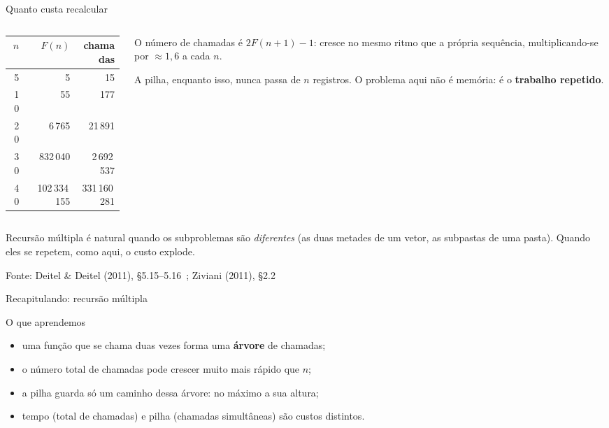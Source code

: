 \documentclass[aspectratio=169]{beamer}
\newcommand{\fonte}[1]{\vfill\hfill{\scriptsize\textcolor{UFSGray}{Fonte: #1}}}
\begin{document}
\begin{frame}{Quanto custa recalcular}
  \begin{columns}[c]
    \begin{column}{0.46\textwidth}
      \begin{center}
        \small
        \begin{tabular}{rrr}
          \toprule
          $n$ & $F(n)$ & chamadas\\
          \midrule
          5  & 5           & 15\\
          10 & 55          & 177\\
          20 & 6\,765      & 21\,891\\
          30 & 832\,040    & 2\,692\,537\\
          40 & 102\,334\,155 & 331\,160\,281\\
          \bottomrule
        \end{tabular}
      \end{center}
    \end{column}
    \begin{column}{0.5\textwidth}
      \small
      O número de chamadas é $2F(n+1) - 1$: cresce no mesmo ritmo que a
      própria sequência, multiplicando-se por $\approx 1{,}6$ a cada
      $n$.

      \medskip
      A pilha, enquanto isso, nunca passa de $n$ registros. O problema
      aqui não é memória: é o \textbf{trabalho repetido}.
    \end{column}
  \end{columns}
  \begin{block}{}
    \small Recursão múltipla é natural quando os subproblemas são
    \emph{diferentes} (as duas metades de um vetor, as subpastas de uma
    pasta). Quando eles se repetem, como aqui, o custo explode.
  \end{block}
  \fonte{Deitel \& Deitel (2011), §5.15--5.16~\cite{deitel2011como};
    Ziviani (2011), §2.2~\cite{ziviani2011projeto}}
\end{frame}

\begin{frame}{Recapitulando: recursão múltipla}
  \begin{block}{O que aprendemos}
    \begin{itemize}
      \item uma função que se chama duas vezes forma uma \textbf{árvore} de
        chamadas;
      \item o número total de chamadas pode crescer muito mais rápido que
        $n$;
      \item a pilha guarda só um caminho dessa árvore: no máximo a sua
        altura;
      \item tempo (total de chamadas) e pilha (chamadas simultâneas) são
        custos distintos.
    \end{itemize}
  \end{block}
\end{frame}
\end{document}
